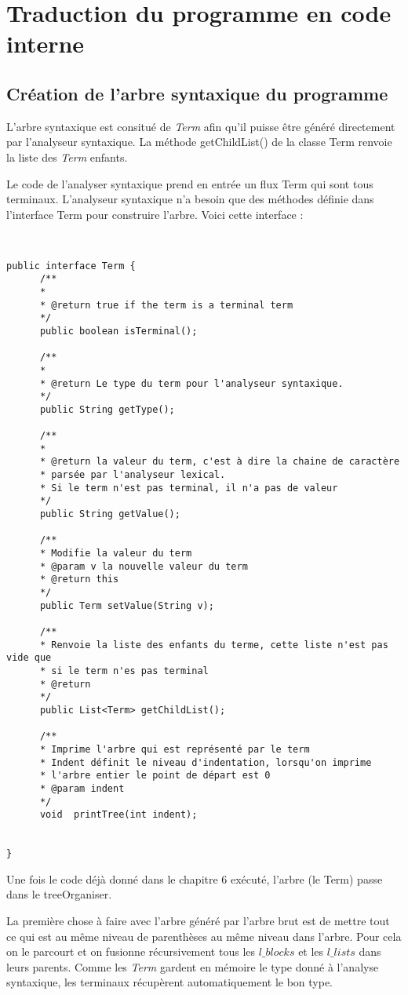 \section{Traduction du programme en code interne}
\subsection{Création de l'arbre syntaxique du programme}
L'arbre syntaxique est consitué de \emph{Term} afin
qu'il puisse être généré directement par l'analyseur syntaxique. 
La méthode getChildList() de la classe Term renvoie la liste des \emph{Term} enfants.


Le code de l'analyser syntaxique prend en entrée un flux Term qui sont tous terminaux. 
L'analyseur syntaxique n'a besoin que des méthodes définie dans l'interface Term pour construire l'arbre.
Voici cette interface : 
{\tiny
\begin{verbatim}
 

public interface Term {
	  /**
	  * 
	  * @return true if the term is a terminal term
	  */
	  public boolean isTerminal();
	  
	  /**
	  * 
	  * @return Le type du term pour l'analyseur syntaxique.
	  */
	  public String getType();
	
	  /**
	  * 
	  * @return la valeur du term, c'est à dire la chaine de caractère
	  * parsée par l'analyseur lexical.
	  * Si le term n'est pas terminal, il n'a pas de valeur
	  */
	  public String getValue();
	
	  /**
	  * Modifie la valeur du term
	  * @param v la nouvelle valeur du term
	  * @return this
	  */
	  public Term setValue(String v);
	
	  /**
	  * Renvoie la liste des enfants du terme, cette liste n'est pas vide que
	  * si le term n'es pas terminal
	  * @return
	  */
	  public List<Term> getChildList();
	
	  /**
	  * Imprime l'arbre qui est représenté par le term
	  * Indent définit le niveau d'indentation, lorsqu'on imprime
	  * l'arbre entier le point de départ est 0
	  * @param indent
	  */
	  void	printTree(int indent);
	
	
}
\end{verbatim}}


Une fois le code déjà donné dans le chapitre 6 exécuté, l'arbre (le Term) passe dans le treeOrganiser.

La première chose à faire avec l'arbre généré par l'arbre brut est
de mettre tout ce qui est au même niveau de parenthèses au même niveau
dans l'arbre. Pour cela on le parcourt et on fusionne récursivement tous
les $l\_blocks$ et les $l\_lists$ dans leurs parents. Comme les \emph{Term}
gardent en mémoire le type donné à l'analyse syntaxique, les terminaux
récupèrent automatiquement le bon type. 
 
